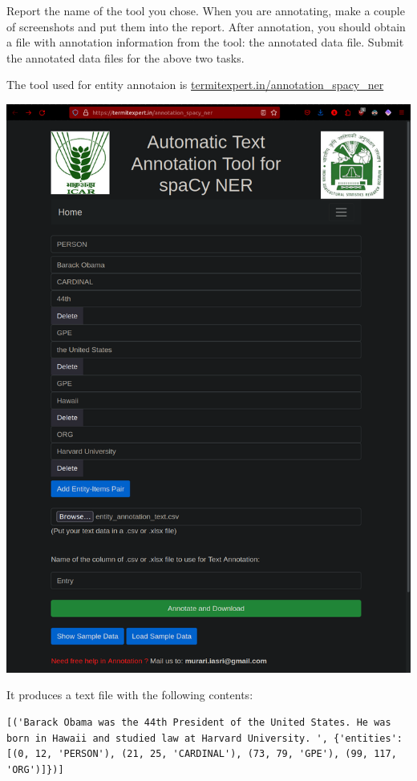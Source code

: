 \documentclass[conference]{IEEEtran}
\begin{document}
\begin{enumerate}
Report the name of the tool you chose. When you are annotating, make a couple of screenshots and put them into the report. After annotation, you should obtain a file with annotation information from the tool: the annotated data file. Submit the annotated data files for the above two tasks.
\begin{multicols}{2}
The tool used for entity annotaion is \url{termitexpert.in/annotation_spacy_ner}
\begin{center}
\includegraphics[scale=0.2]{entity_annotation_screenshot.png}
\end{center}
It produces a text file with the following contents:\\
\begin{lstlisting}
[('Barack Obama was the 44th President of the United States. He was born in Hawaii and studied law at Harvard University. ', {'entities': [(0, 12, 'PERSON'), (21, 25, 'CARDINAL'), (73, 79, 'GPE'), (99, 117, 'ORG')]})]
\end{lstlisting}
\end{multicols}


\end{enumerate}
\end{document}
